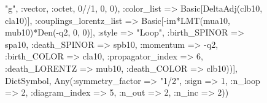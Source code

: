 \documentclass{revtex4}
\begin{document}
\begin{figure}[!htb]
\begin{center}
{"g", :vector, :octet, 0//1, 0, 0), :color_list => Basic[DeltaAdj(clb10, cla10)], :couplings_lorentz_list => Basic[-im*LMT(mua10, mub10)*Den(-q2, 0, 0)], :style => "Loop", :birth_SPINOR => spa10, :death_SPINOR => spb10, :momentum => -q2, :birth_COLOR => cla10, :propagator_index => 6, :death_LORENTZ => mub10, :death_COLOR => clb10))], Dict{Symbol, Any}(:symmetry_factor => "1/2", :sign => 1, :n_loop => 2, :diagram_index => 5, :n_out => 2, :n_inc => 2)) 
}
\end{center}
\end{figure}
\end{document}
